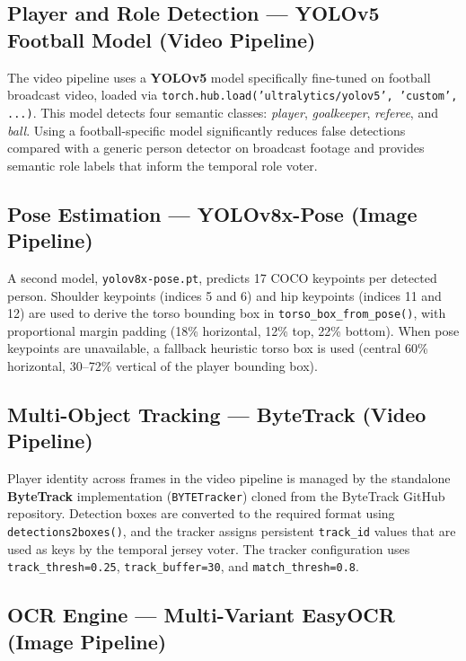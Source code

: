 \subsection{Player and Role Detection --- YOLOv5 Football Model (Video Pipeline)}

The video pipeline uses a \textbf{YOLOv5} model specifically fine-tuned
on football broadcast video, loaded via
\texttt{torch.hub.load('ultralytics/yolov5', 'custom', ...)}. This model
detects four semantic classes: \textit{player}, \textit{goalkeeper},
\textit{referee}, and \textit{ball}. Using a football-specific model
significantly reduces false detections compared with a generic person
detector on broadcast footage and provides semantic role labels that
inform the temporal role voter.

\subsection{Pose Estimation --- YOLOv8x-Pose (Image Pipeline)}

A second model, \texttt{yolov8x-pose.pt}, predicts 17 COCO keypoints per
detected person. Shoulder keypoints (indices 5 and 6) and hip keypoints
(indices 11 and 12) are used to derive the torso bounding box in
\texttt{torso\_box\_from\_pose()}, with proportional margin padding
(18\% horizontal, 12\% top, 22\% bottom). When pose keypoints are
unavailable, a fallback heuristic torso box is used (central 60\%
horizontal, 30--72\% vertical of the player bounding box).

\subsection{Multi-Object Tracking --- ByteTrack (Video Pipeline)}

Player identity across frames in the video pipeline is managed by the
standalone \textbf{ByteTrack} implementation
(\texttt{BYTE\-Tracker}) cloned from the ByteTrack GitHub repository.
Detection boxes are converted to the required format using
\texttt{detections2boxes()}, and the tracker assigns persistent
\texttt{track\_id} values that are used as keys by the temporal jersey
voter. The tracker configuration uses \texttt{track\-\_thresh=0.25},
\texttt{track\-\_buffer=30}, and \texttt{match\_thresh=0.8}.

\subsection{OCR Engine --- Multi-Variant EasyOCR (Image Pipeline)}

